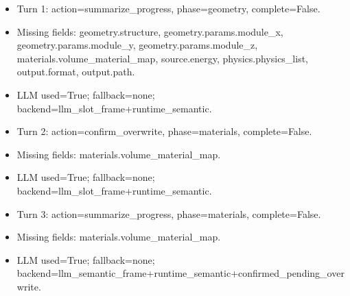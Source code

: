 \documentclass[11pt]{ctexart}
\begin{document}
\begin{itemize}
\item Turn 1: action=summarize\_progress, phase=geometry, complete=False.
\item Missing fields: geometry.structure, geometry.params.module\_x, geometry.params.module\_y, geometry.params.module\_z, materials.volume\_material\_map, source.energy, physics.physics\_list, output.format, output.path.
\item LLM used=True; fallback=none; backend=llm\_slot\_frame+runtime\_semantic.
\item Turn 2: action=confirm\_overwrite, phase=materials, complete=False.
\item Missing fields: materials.volume\_material\_map.
\item LLM used=True; fallback=none; backend=llm\_slot\_frame+runtime\_semantic.
\item Turn 3: action=summarize\_progress, phase=materials, complete=False.
\item Missing fields: materials.volume\_material\_map.
\item LLM used=True; fallback=none; backend=llm\_semantic\_frame+runtime\_semantic+confirmed\_pending\_overwrite.
\end{itemize}
\end{document}
